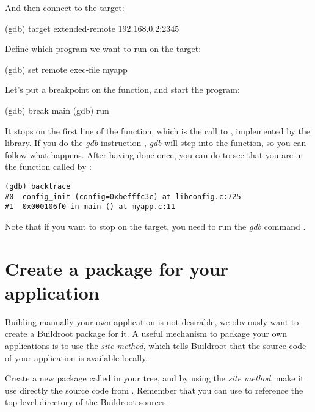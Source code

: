 And then connect to the target:

\begin{bashinput}
(gdb) target extended-remote 192.168.0.2:2345
\end{bashinput}

Define which program we want to run on the target:

\begin{bashinput}
(gdb) set remote exec-file myapp
\end{bashinput}

Let's put a breakpoint on the  function, and start the
program:

\begin{bashinput}
(gdb) break main
(gdb) run
\end{bashinput}

It stops on the first line of the  function, which is the
call to , implemented by the 
library. If you do the {\em gdb} instruction , {\em gdb}
will step into the function, so you can follow what happens. After
having done  once, you can do  to see that
you are in the function  called by :

\begin{verbatim}
(gdb) backtrace
#0  config_init (config=0xbefffc3c) at libconfig.c:725
#1  0x000106f0 in main () at myapp.c:11
\end{verbatim}

Note that if you want  to stop on the target, you need
to run the {\em gdb} command .

\section{Create a package for your application}

Building manually your own application is not desirable, we obviously
want to create a Buildroot package for it. A useful mechanism to
package your own applications is to use the
 {\em site method}, which tells Buildroot that the source
code of your application is available locally.

Create a new package called  in your 
tree, and by using the  {\em site method}, make it use
directly the  source code from
. Remember that you can use 
to reference the top-level directory of the Buildroot sources.


